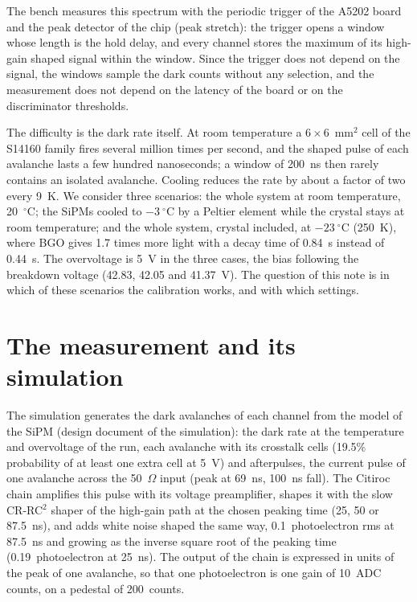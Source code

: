 \documentclass[11pt]{article}
\newcommand{\us}{\textmu s\xspace}
\begin{document}
The bench measures this spectrum with the periodic trigger of the A5202
board and the peak detector of the chip (peak stretch): the trigger opens
a window whose length is the hold delay, and every channel stores the
maximum of its high-gain shaped signal within the window. Since the
trigger does not depend on the signal, the windows sample the dark counts
without any selection, and the measurement does not depend on the
latency of the board or on the discriminator thresholds.

The difficulty is the dark rate itself. At room temperature a
$6 \times 6$~mm$^2$ cell of the S14160 family fires several million times
per second, and the shaped pulse of each avalanche lasts a few hundred
nanoseconds; a window of 200~ns then rarely contains an isolated avalanche.
Cooling reduces the rate by about a factor of two every 9~K. We consider
three scenarios: the whole system at room temperature, 20~$^\circ$C; the
SiPMs cooled to $-3~^\circ$C by a Peltier element while the crystal stays
at room temperature; and the whole system, crystal included, at
$-23~^\circ$C (250~K), where BGO gives 1.7 times more light with a decay
time of 0.84~\us instead of 0.44~\us. The overvoltage is 5~V in the three
cases, the bias following the breakdown voltage (42.83, 42.05 and
41.37~V). The question of this note is in which of these scenarios the
calibration works, and with which settings.

\section{The measurement and its simulation}
\label{sec:method}

The simulation generates the dark avalanches of each channel from the
model of the SiPM (design document of the simulation): the dark rate at
the temperature and overvoltage of the run, each avalanche with its
crosstalk cells (19.5\% probability of at least one extra cell at 5~V) and
afterpulses, the current pulse of one avalanche across the 50~$\Omega$
input (peak at 69~ns, 100~ns fall). The Citiroc chain amplifies this
pulse with its voltage preamplifier, shapes it with the slow CR-RC$^2$
shaper of the high-gain path at the chosen peaking time (25, 50 or
87.5~ns), and adds white noise shaped the same way, 0.1~photoelectron rms
at 87.5~ns and growing as the inverse square root of the peaking time
(0.19~photoelectron at 25~ns). The output of the chain is expressed in
units of the peak of one avalanche, so that one photoelectron is one gain
of 10~ADC counts, on a pedestal of 200~counts.
\end{document}
